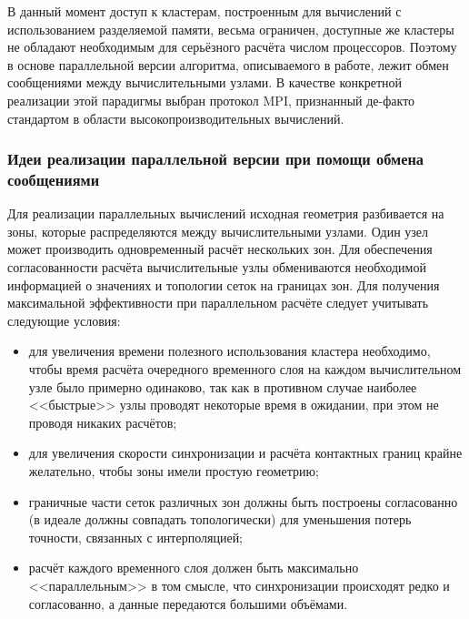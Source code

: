 В данный момент доступ к кластерам, построенным для вычислений с использованием разделяемой памяти, весьма ограничен, доступные же кластеры не обладают необходимым для серьёзного расчёта числом процессоров. Поэтому в основе параллельной версии алгоритма, описываемого в работе, лежит обмен сообщениями между вычислительными узлами. В качестве конкретной реализации этой парадигмы выбран протокол MPI, признанный де-факто стандартом в области высокопроизводительных вычислений.

\subsubsection{Идеи реализации параллельной версии при помощи обмена сообщениями}
Для реализации параллельных вычислений исходная геометрия разбивается на зоны, которые распределяются между вычислительными узлами. Один узел может производить одновременный расчёт нескольких зон. Для обеспечения согласованности расчёта вычислительные узлы обмениваются необходимой информацией о значениях и топологии сеток на границах зон. Для получения максимальной эффективности при параллельном расчёте следует учитывать следующие условия:
\begin{itemize}
	\item для увеличения времени полезного использования кластера необходимо, чтобы время расчёта очередного временного слоя на каждом вычислительном узле было примерно одинаково, так как в противном случае наиболее <<быстрые>> узлы проводят некоторые время в ожидании, при этом не проводя никаких расчётов;
	\item для увеличения скорости синхронизации и расчёта контактных границ крайне желательно, чтобы зоны имели простую геометрию;
	\item граничные части сеток различных зон должны быть построены согласованно (в идеале должны совпадать топологически) для уменьшения потерь точности, связанных с интерполяцией;
	\item расчёт каждого временного слоя должен быть максимально <<параллельным>> в том смысле, что синхронизации происходят редко и согласованно, а данные передаются большими объёмами.
\end{itemize}
